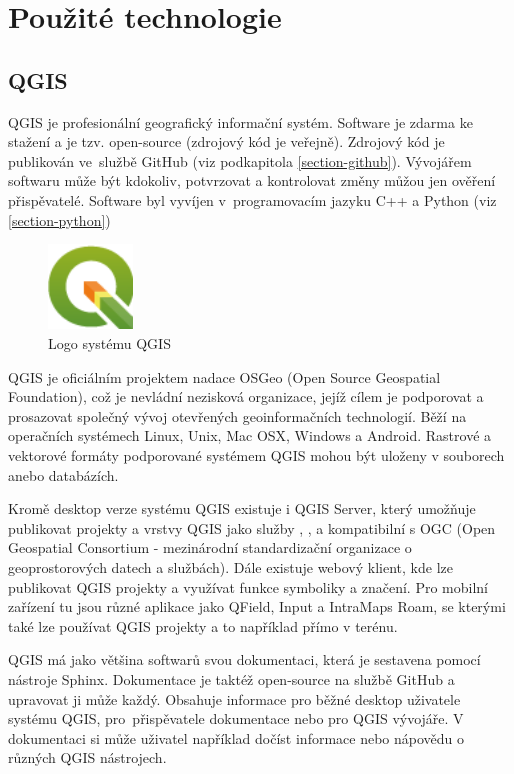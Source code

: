 \chapter{Použité technologie}
\label{4-technologie}

\section{QGIS}

QGIS je profesionální geografický informační systém.
Software je zdarma ke stažení a je tzv. open-source (zdrojový kód je veřejně).
Zdrojový kód je publikován ve~službě GitHub (viz podkapitola \ref{section-github}).
Vývojářem softwaru může být kdokoliv, potvrzovat a kontrolovat změny můžou jen ověření
přispěvatelé. Software byl vyvíjen v~programovacím jazyku C++ a Python (viz \ref{section-python})

\begin{figure}[H] \centering
    \includegraphics[width=64pt]{./pictures/qgis-logo.png}
    \caption[Logo systému QGIS]{Logo systému QGIS \cite{qgis}}
	\label{fig:qgis-logo}                                
\end{figure}

QGIS je oficiálním projektem nadace OSGeo (Open Source Geospatial Foundation), což je nevládní 
nezisková organizace, jejíž cílem je podporovat a prosazovat společný vývoj otevřených geoinformačních
technologií. Běží na operačních systémech Linux, Unix, Mac OSX, Windows a Android.
Rastrové a vektorové formáty podporované systémem QGIS mohou být uloženy v souborech anebo databázích.


Kromě desktop verze systému QGIS existuje i QGIS Server, který umožňuje publikovat projekty a vrstvy
QGIS jako služby , ,  a  kompatibilní s OGC (Open Geospatial Consortium - mezinárodní standardizační organizace
o geoprostorových datech a službách). Dále existuje webový klient, kde lze publikovat
QGIS projekty a využívat funkce symboliky a značení. Pro mobilní zařízení tu jsou
různé aplikace jako QField, Input a IntraMaps Roam, se kterými také lze používat QGIS projekty a to 
například přímo v terénu. 


QGIS má jako většina softwarů svou dokumentaci, která je sestavena pomocí nástroje Sphinx. 
Dokumentace je taktéž open-source na službě GitHub a upravovat ji může každý. Obsahuje
informace pro běžné desktop uživatele systému QGIS, pro~přispěvatele dokumentace nebo pro QGIS
vývojáře. V dokumentaci si může uživatel například dočíst informace nebo nápovědu o různých
QGIS nástrojech.

